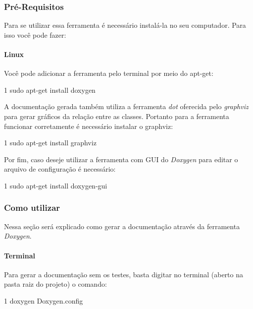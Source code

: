 \subsubsection*{Pré-\/\+Requisitos}

Para se utilizar essa ferramenta é necessário instalá-\/la no seu computador. Para isso você pode fazer\+:

\paragraph*{Linux}

Você pode adicionar a ferramenta pelo terminal por meio do apt-\/get\+:


\begin{DoxyCode}
1 sudo apt-get install doxygen 
\end{DoxyCode}


A documentação gerada também utiliza a ferramenta {\itshape dot} oferecida pelo {\itshape graphviz} para gerar gráficos da relação entre as classes. Portanto para a ferramenta funcionar corretamente é necessário instalar o graphviz\+:


\begin{DoxyCode}
1 sudo apt-get install graphviz
\end{DoxyCode}


Por fim, caso deseje utilizar a ferramenta com G\+UI do {\itshape Doxygen} para editar o arquivo de configuração é necessário\+:


\begin{DoxyCode}
1 sudo apt-get install doxygen-gui
\end{DoxyCode}


\subsubsection*{Como utilizar}

Nessa seção será explicado como gerar a documentação através da ferramenta {\itshape Doxygen}.

\paragraph*{Terminal}

Para gerar a documentação sem os testes, basta digitar no terminal (aberto na pasta raiz do projeto) o comando\+:


\begin{DoxyCode}
1 doxygen Doxygen.config 
\end{DoxyCode}


